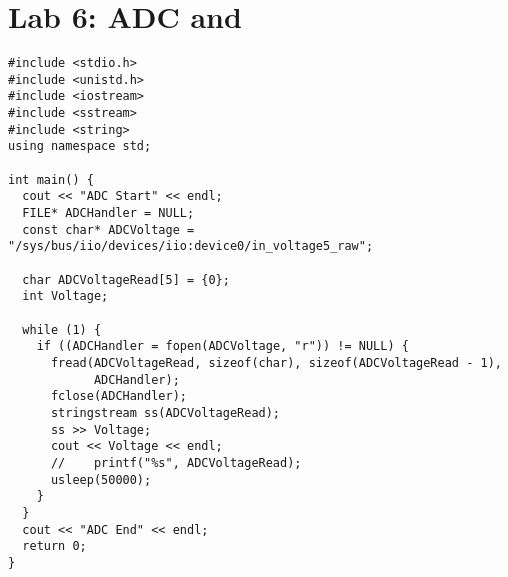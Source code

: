 \documentclass{article}
\let\Oldsection\section
\renewcommand{\section}{\FloatBarrier\Oldsection}
\def\CC{{C\nolinebreak[4]\hspace{-.05em}\raisebox{.4ex}{\tiny\bf ++}}}
\begin{document}
\clearpage
\section{Lab 6: ADC and \protect\CC}
\begin{lstlisting}[style=C++Style]
#include <stdio.h>
#include <unistd.h>
#include <iostream>
#include <sstream>
#include <string>
using namespace std;

int main() {
  cout << "ADC Start" << endl;
  FILE* ADCHandler = NULL;
  const char* ADCVoltage = "/sys/bus/iio/devices/iio:device0/in_voltage5_raw";

  char ADCVoltageRead[5] = {0};
  int Voltage;

  while (1) {
    if ((ADCHandler = fopen(ADCVoltage, "r")) != NULL) {
      fread(ADCVoltageRead, sizeof(char), sizeof(ADCVoltageRead - 1),
            ADCHandler);
      fclose(ADCHandler);
      stringstream ss(ADCVoltageRead);
      ss >> Voltage;
      cout << Voltage << endl;
      //	printf("%s", ADCVoltageRead);
      usleep(50000);
    }
  }
  cout << "ADC End" << endl;
  return 0;
}
\end{lstlisting}

\clearpage
\end{document}
